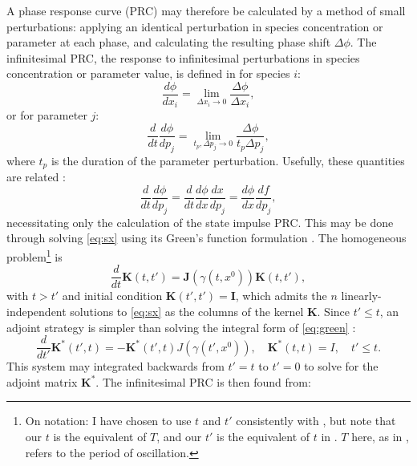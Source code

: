 A phase response curve (PRC) may therefore be calculated by a method of small perturbations: applying an identical perturbation in species concentration or parameter at each phase, and calculating the resulting phase shift $\Delta\phi$.
The infinitesimal PRC, the response to infinitesimal perturbations in species concentration or parameter value, is defined in \cite{Taylor2008a} for species $i$:
\begin{equation}
    \frac{d\phi}{dx_i} = \lim_{\Delta x_i\to 0} \frac{\Delta\phi}{\Delta x_i},
\end{equation}
or for parameter $j$:
\begin{equation}
    \frac{d}{dt}\frac{d\phi}{dp_j} = \lim_{t_p,\Delta p_j\to 0} \frac{\Delta\phi}{t_p \Delta p_j},
\end{equation}
where $t_p$ is the duration of the parameter perturbation.
Usefully, these quantities are related \cite{Taylor2008a}:
\begin{equation}\label{eq:prccomp}
    \frac{d}{dt}\frac{d\phi}{dp_j} = 
    \frac{d}{dt}\frac{d\phi}{dx}\frac{dx}{dp_j} =
    \frac{d\phi}{dx}\frac{df}{dp_j},
\end{equation}
necessitating only the calculation of the state impulse PRC.
This may be done through solving \eqref{eq:sx} using its Green's function formulation \cite{Rabitz1983}.
The homogeneous problem\footnote{On notation:
    I have chosen to use $t$ and $t'$ consistently with \cite{Rabitz1983,Kramer1984}, but note that our $t$ is the equivalent of $T$, and our $t'$ is the equivalent of $t$ in \cite{Taylor2008a}. $T$ here, as in \cite{Rabitz1983,Kramer1984}, refers to the period of oscillation.
            } 
is
\begin{equation}\label{eq:green}
    \frac{d}{dt}\mathbf{K}(t,t') = \mathbf{J}(\gamma(t,x^0))\mathbf{K}(t,t'),
\end{equation}
with $t>t'$ and initial condition $\mathbf{K}(t',t') = \mathbf{I}$, which admits the $n$ linearly-independent solutions to \eqref{eq:sx} as the columns of the kernel $\mathbf{K}$.
Since $t'\leq t$, an adjoint strategy is simpler than solving the integral form of \eqref{eq:green} \cite{Kramer1984}:
\begin{equation}
    \frac{d}{dt'}\mathbf{K}^\ast (t',t) = -\mathbf{K}^\ast (t',t)J(\gamma(t',x^0)), \quad \mathbf{K}^\ast (t,t) = I, \quad t' \leq t.
\end{equation}
This system may integrated backwards from $t'=t$ to $t'=0$ to solve for the adjoint matrix $\mathbf{K}^\ast$.
The infinitesimal PRC is then found from:
